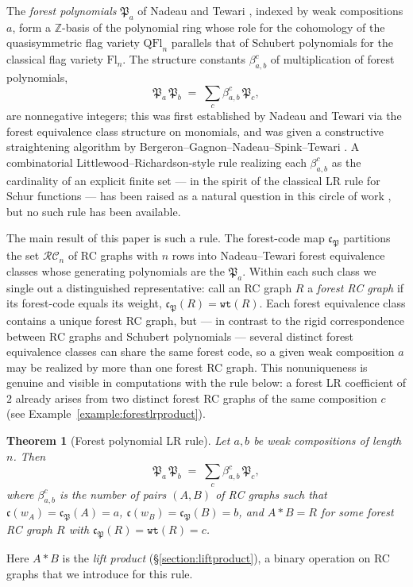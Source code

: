 \documentclass[pdflatex,sn-mathphys-num]{sn-jnl}
\numberwithin{equation}{subsection}
\newcommand{\wof}[1]{w_{#1}}
\newcommand{\wtt}{\mathtt{wt}}
\newcommand{\RC}{\mathcal{RC}}
\newcommand{\code}{\mathfrak{c}}
\newcommand{\forest}{\mathfrak{P}}
\theoremstyle{thmstyleone}
\newtheorem{theorem}{Theorem}[section]
\theoremstyle{thmstylethree}
\theoremstyle{thmstyletwo}
\begin{document}
The \emph{forest polynomials} $\forest_a$ of Nadeau and Tewari \cite{nadeau2024forest}, indexed by weak compositions $a$, form a $\mathbb{Z}$-basis of the polynomial ring whose role for the cohomology of the quasisymmetric flag variety $\mathrm{QFl}_n$ \cite{bergeron2025qsymflag} parallels that of Schubert polynomials for the classical flag variety $\mathrm{Fl}_n$. The structure constants $\beta_{a,b}^c$ of multiplication of forest polynomials,
$$\forest_a\,\forest_b \;=\; \sum_c \beta_{a,b}^c\,\forest_c,$$
are nonnegative integers; this was first established by Nadeau and Tewari \cite{nadeau2024forest} via the forest equivalence class structure on monomials, and was given a constructive straightening algorithm by Bergeron--Gagnon--Nadeau--Spink--Tewari \cite{bergeron2025equivariant}. A combinatorial Littlewood--Richardson-style rule realizing each $\beta_{a,b}^c$ as the cardinality of an explicit finite set --- in the spirit of the classical LR rule for Schur functions --- has been raised as a natural question in this circle of work \cite{nadeau2024forest,nadeau2024quasisymmetric,bergeron2025qsymflag}, but no such rule has been available.

The main result of this paper is such a rule. The forest-code map $\code_\forest$ partitions the set $\RC_n$ of RC graphs with $n$ rows into Nadeau--Tewari forest equivalence classes whose generating polynomials are the $\forest_a$. Within each such class we single out a distinguished representative: call an RC graph $R$ a \emph{forest RC graph} if its forest-code equals its weight, $\code_\forest(R) = \wtt(R)$. Each forest equivalence class contains a unique forest RC graph, but --- in contrast to the rigid correspondence between RC graphs and Schubert polynomials --- several distinct forest equivalence classes can share the same forest code, so a given weak composition $a$ may be realized by more than one forest RC graph. This nonuniqueness is genuine and visible in computations with the rule below: a forest LR coefficient of $2$ already arises from two distinct forest RC graphs of the same composition $c$ (see Example~\ref{example:forestlrproduct}).

\begin{theorem}[Forest polynomial LR rule]\label{theorem:forestpolyLR}
Let $a,b$ be weak compositions of length $n$. Then
$$\forest_a\,\forest_b \;=\; \sum_c \beta_{a,b}^c\,\forest_c,$$
where $\beta_{a,b}^c$ is the number of pairs $(A,B)$ of RC graphs such that $\code(\wof{A}) = \code_\forest(A) = a$, $\code(\wof{B}) = \code_\forest(B) = b$, and $A*B = R$ for some forest RC graph $R$ with $\code_\forest(R) = \wtt(R) = c$.
\end{theorem}
Here $A*B$ is the \emph{lift product} (\S\ref{section:liftproduct}), a binary operation on RC graphs that we introduce for this rule.
\end{document}
